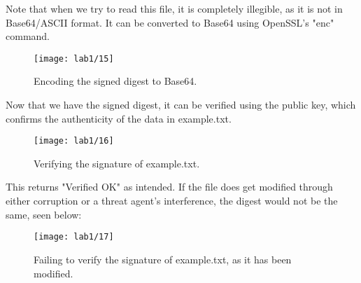 Note that when we try to read this file, it is completely illegible, as it is not in Base64/ASCII format.
It can be converted to Base64 using OpenSSL's "enc" command.

\begin{figure}[H]
    \centering
    \texttt{[image: lab1/15]}
    \caption{Encoding the signed digest to Base64.}
    \label{fig:base64Digest}
\end{figure}

Now that we have the signed digest, it can be verified using the public key, which confirms the authenticity
of the data in example.txt.

\begin{figure}[H]
    \centering
    \texttt{[image: lab1/16]}
    \caption{Verifying the signature of example.txt.}
    \label{fig:signatureVerify}
\end{figure}

This returns "Verified OK" as intended.
If the file does get modified through either corruption or a threat agent's interference,
the digest would not be the same, seen below:

\begin{figure}[H]
    \centering
    \texttt{[image: lab1/17]}
    \caption{Failing to verify the signature of example.txt, as it has been modified.}
    \label{fig:signatureVerifyFail}
\end{figure}
